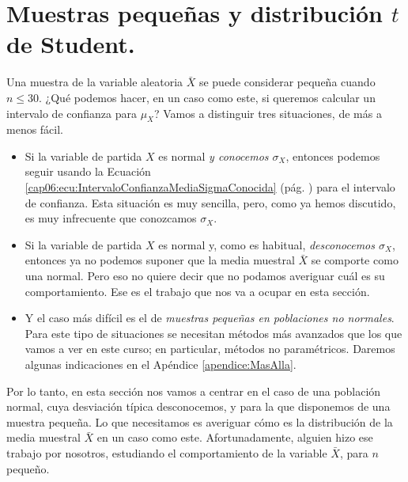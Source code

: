 \section{Muestras pequeñas y distribución $t$ de Student.}
\label{cap06:sec:tStudent}

Una muestra de la variable aleatoria $\bar X$ se puede considerar pequeña
cuando $n\leq 30$. ¿Qué podemos hacer, en un caso como este, si queremos
calcular un intervalo de confianza para $\mu_X$? Vamos a distinguir tres
situaciones, de más a menos fácil.
\begin{itemize}
  \item Si la variable de partida $X$ es normal {\em y conocemos $\sigma_X$},
      entonces podemos seguir usando la Ecuación
      \ref{cap06:ecu:IntervaloConfianzaMediaSigmaConocida} (pág.
      \pageref{cap06:ecu:IntervaloConfianzaMediaSigmaConocida}) para el
      intervalo de confianza. Esta situación es muy sencilla, pero, como ya
      hemos discutido, es muy infrecuente que conozcamos $\sigma_X$.
  \item Si la variable de partida $X$ es normal y, como es habitual, {\em
      desconocemos $\sigma_X$}, entonces ya no podemos suponer que la media
      muestral $\bar X$ se comporte como una normal. Pero eso no quiere decir
      que no podamos averiguar cuál es su comportamiento. Ese es el trabajo
      que nos va a ocupar en esta sección.
  \item Y el caso más difícil es el de {\em muestras pequeñas en poblaciones
      no normales}. Para este tipo de situaciones se necesitan métodos más
      avanzados que los que vamos a ver en este curso; en particular, métodos
      no paramétricos. Daremos algunas indicaciones en el Apéndice
      \ref{apendice:MasAlla}.
\end{itemize}

Por lo tanto, en esta sección nos vamos a centrar en el caso de una población
normal, cuya desviación típica desconocemos, y para la que disponemos de una
muestra pequeña. Lo que necesitamos es averiguar cómo es la distribución de la
media muestral $\bar X$ en un caso como este. Afortunadamente, alguien hizo ese
trabajo por nosotros, estudiando el comportamiento de la variable $\bar X$,
para $n$ pequeño.


